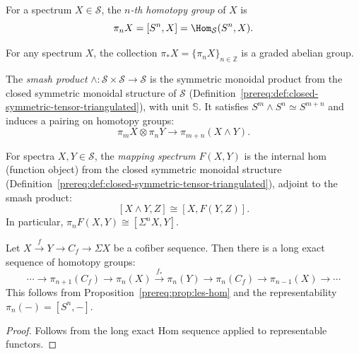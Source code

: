 \begin{definition}\label{prereq:def:homotopy-groups}
    \leanok
    For a spectrum $X \in \mathcal{S}$, the \emph{$n$-th homotopy group} of $X$ is
    $$\pi_n X = [S^n, X] = \Hom_{\mathcal{S}}(S^n, X).$$
\end{definition}

\begin{proposition}\label{prereq:prop:homotopy-graded-abelian}
    \leanok
    For any spectrum $X$, the collection $\pi_* X = \{\pi_n X\}_{n \in \mathbb{Z}}$ is a graded abelian group.
\end{proposition}

\begin{definition}\label{prereq:def:smash-product}
    \leanok
    The \emph{smash product} $\wedge: \mathcal{S} \times \mathcal{S} \to \mathcal{S}$ is the symmetric monoidal product from the closed symmetric monoidal structure of $\mathcal{S}$ (Definition~\ref{prereq:def:closed-symmetric-tensor-triangulated}), with unit $\mathbb{S}$. It satisfies $S^m \wedge S^n \simeq S^{m+n}$ and induces a pairing on homotopy groups:
    $$\pi_m X \otimes \pi_n Y \to \pi_{m+n}(X \wedge Y).$$
\end{definition}

\begin{definition}\label{prereq:def:mapping-spectra}
    \leanok
    For spectra $X, Y \in \mathcal{S}$, the \emph{mapping spectrum} $F(X, Y)$ is the internal hom (function object) from the closed symmetric monoidal structure (Definition~\ref{prereq:def:closed-symmetric-tensor-triangulated}), adjoint to the smash product:
    $$[X \wedge Y, Z] \cong [X, F(Y, Z)].$$
    In particular, $\pi_n F(X, Y) \cong [\Sigma^n X, Y]$.
\end{definition}

\begin{proposition}\label{prereq:prop:les-homotopy}
    \leanok
    Let $X \xrightarrow{f} Y \to C_f \to \Sigma X$ be a cofiber sequence. Then there is a long exact sequence of homotopy groups:
    $$\cdots \to \pi_{n+1}(C_f) \to \pi_n(X) \xrightarrow{f_*} \pi_n(Y) \to \pi_n(C_f) \to \pi_{n-1}(X) \to \cdots$$
    This follows from Proposition~\ref{prereq:prop:les-hom} and the representability $\pi_n(-) = [S^n, -]$.
\end{proposition}
\begin{proof}\leanok Follows from the long exact Hom sequence applied to representable functors.\end{proof}

